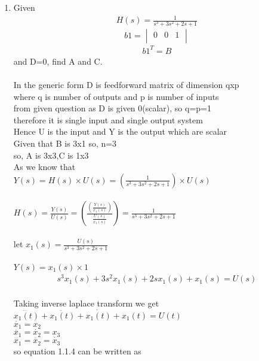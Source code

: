 \begin{enumerate}[label=\thesection.\arabic*.,ref=\thesection.\theenumi]
\item Given 
\begin{align}
H(s)=\frac{1}{s^3+3s^2+2s+1}
\end{align}
\begin{equation}
 b1 =\begin{vmatrix}
  0&0&1\\
 \end{vmatrix}
\end{equation}
\begin{align}
b1^T=B
\end{align}
and D=0, find A and C.
\\
\solution
\\ In the generic form D is feedforward matrix of dimension qxp
\\ where q is number of outputs and  p is number of inputs
\\ from given question as D is given 0(scalar), so q=p=1
\\ therefore it is single input and single output system
\\ Hence U is the input and Y is the output which are scalar
\\ Given that B is 3x1 so, n=3
\\ so, A is 3x3,C is 1x3
\\ As we know that
\\ $Y(s)=H(s) \times U(s)= (\frac{1}{s^3+3s^2+2s+1}) \times U(s) $
\\
\\ $H(s)=\frac{Y(s)}{U(s)}=(\frac{(\frac{Y(s)}{x_{1}(s)})}{\frac{U(s)}{x_{1}(s)}})=\frac{1}{s^3+3s^2+2s+1} $
\\
\\let   $x_{1}(s)=\frac{U(s)}{s^3+3s^2+2s+1}$
\\
\\$Y(s)=x_{1}(s)\times 1 $
\begin{align}
s^3x_{1}(s)+3s^2x_{1}(s)+2sx_{1}(s)+x_{1}(s)=U(s)
\end{align}
\\ Taking inverse laplace transform we get
\\$\dddot{x_{1}(t)}+\ddot{x_{1}(t)}+\dot{x_{1}(t)}+x_{1}(t)=U(t)$
\\$\dot{x_{1}}=x_{2}$
\\$\ddot{x_{1}}=\dot{x_{2}}=x_{3}$
\\$\dddot{x_{1}}=\ddot{x_{2}}=\dot{x_{3}}$
\\ so equation 1.1.4 can be written as
\\
\begin{gather}

\end{gather}
\end{enumerate}
